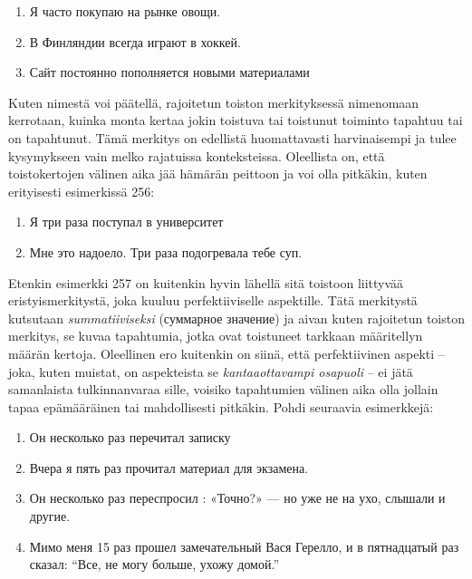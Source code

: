 \documentclass[]{scrartcl}
\providecommand{\tightlist}{%
  \setlength{\itemsep}{0pt}\setlength{\parskip}{0pt}}
\begin{document}
\begin{enumerate}
\def\labelenumi{(\arabic{enumi})}
\setcounter{enumi}{252}
\tightlist
\item
  Я часто покупаю на рынке овощи.
\item
  В Финляндии всегда играют в хоккей.
\item
  Сайт постоянно пополняется новыми материалами
\end{enumerate}

Kuten nimestä voi päätellä, rajoitetun toiston merkityksessä nimenomaan
kerrotaan, kuinka monta kertaa jokin toistuva tai toistunut toiminto
tapahtuu tai on tapahtunut. Tämä merkitys on edellistä huomattavasti
harvinaisempi ja tulee kysymykseen vain melko rajatuissa konteksteissa.
Oleellista on, että toistokertojen välinen aika jää hämärän peittoon ja
voi olla pitkäkin, kuten erityisesti esimerkissä 256:

\begin{enumerate}
\def\labelenumi{(\arabic{enumi})}
\setcounter{enumi}{255}
\tightlist
\item
  Я три раза поступал в университет
\item
  Мне это надоело. Три раза подогревала тебе суп.
\end{enumerate}

Etenkin esimerkki 257 on kuitenkin hyvin lähellä sitä toistoon liittyvää
eristyismerkitystä, joka kuuluu perfektiiviselle aspektille. Tätä
merkitystä kutsutaan \emph{summatiiviseksi} (суммарное значение) ja
aivan kuten rajoitetun toiston merkitys, se kuvaa tapahtumia, jotka ovat
toistuneet tarkkaan määritellyn määrän kertoja. Oleellinen ero kuitenkin
on siinä, että perfektiivinen aspekti -- joka, kuten muistat, on
aspekteista se \emph{kantaaottavampi osapuoli} -- ei jätä samanlaista
tulkinnanvaraa sille, voisiko tapahtumien välinen aika olla jollain
tapaa epämääräinen tai mahdollisesti pitkäkin. Pohdi seuraavia
esimerkkejä:

\begin{enumerate}
\def\labelenumi{(\arabic{enumi})}
\setcounter{enumi}{257}
\tightlist
\item
  Он несколько раз перечитал записку
\item
  Вчера я пять раз прочитал материал для экзамена.
\item
  Он несколько раз переспросил : «Точно?» --- но уже не на ухо, слышали
  и другие.
\item
  Мимо меня 15 раз прошел замечательный Вася Герелло, и в пятнадцатый
  раз сказал: ``Все, не могу больше, ухожу домой.''
\end{enumerate}
\end{document}
